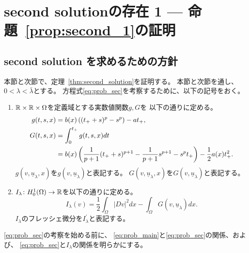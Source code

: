\section{second solutionの存在 1 --- 命題~\ref{prop:second_1}の証明} \label{sec:second_sol}

\subsection{second solution を求めるための方針}

本節と次節で、定理~\ref{thm:second_solution}を証明する。
本節と次節を通し、$0 < \lambda < \bar{\lambda}$とする。
方程式\ref{eq:prob_sec}を考察するために、以下の記号をおく。

\begin{nota}
 \begin{enumerate}[1.]
  \item $\mathbb{R} \times \mathbb{R} \times \Omega$を定義域とする実数値関数$g, G$を
        以下の通りに定める。
        \begin{align}
         g(t, s, x) &= b(x) \left( (t_+ + s)^p - s^p \right) - a t_+, 
         \label{eq:def_g} \\
         G(t, s, x) &= \int_0^{t_+} g(t, s, x) dt
         \notag \\
         &= b(x) \left( \frac{1}{p+1} (t_+ + s)^{p+1} - \frac{1}{p+1}
         s^{p+1} - s^p t_+ \right) - \frac{1}{2} a(x) t_+^2.
         \label{eq:def_G}
        \end{align}
        $g(v, \underline{u}_\lambda, x)$を$g(v, \underline{u}_\lambda
        )$と表記する。
        $G(v,\underline{u}_\lambda, x)$を$G(v, \underline{u}_\lambda
        )$と表記する。
  \item $I_{\lambda} \colon H_0^1(\Omega) \to \mathbb{R}$を以下の通りに定める。
        \begin{equation}
         I_\lambda (v) = \frac{1}{2} \int_\Omega \lvert Dv \rvert^2 dx
          - \int_\Omega G(v, \underline{u}_\lambda) dx. \label{eq:def_I}
        \end{equation}
        $I_\lambda$のフレッシェ微分を$I_\lambda^\prime$と表記する。
 \end{enumerate}
\end{nota}

\ref{eq:prob_sec}の考察を始める前に、
\ref{eq:prob_main}と\ref{eq:prob_sec}の関係、および、
\ref{eq:prob_sec}と$I_\lambda$の関係を明らかにする。

